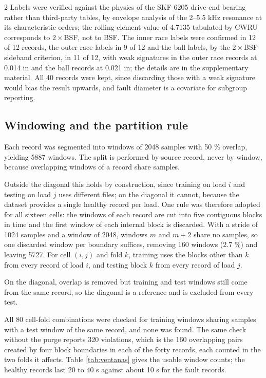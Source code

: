 \documentclass[12pt,twoside,titlepage]{ingenius}
\begin{document}
\begin{multicols}{2}
Labels were verified against the physics of the SKF 6205 drive-end bearing
rather than third-party tables, by envelope analysis of the 2--5.5 kHz
resonance at its characteristic orders; the rolling-element value of 4.7135
tabulated by CWRU corresponds to $2\times$BSF, not to BSF. The inner race labels
were confirmed in 12 of 12 records, the outer race labels in 9 of 12 and the
ball labels, by the $2\times$BSF sideband criterion, in 11 of 12, with weak
signatures in the outer race records at 0.014 in and the ball records at
0.021 in; the details are in the supplementary material. All 40 records were
kept, since discarding those with a weak signature would bias the result
upwards, and fault diameter is a covariate for subgroup reporting.

\subsection{Windowing and the partition rule}

Each record was segmented into windows of 2048 samples with 50 \% overlap,
yielding 5887 windows. The split is performed by source record, never by window,
because overlapping windows of a record share samples.

Outside the diagonal this holds by construction, since training on load $i$ and
testing on load $j$ uses different files; on the diagonal it cannot, because the
dataset provides a single healthy record per load. One rule was therefore
adopted for all sixteen cells: the windows of each record are cut into five
contiguous blocks in time and the first window of each internal block is
discarded. With a stride of 1024 samples and a window of 2048, windows $m$ and
$m+2$ share no samples, so one discarded window per boundary suffices, removing
160 windows (2.7 \%) and leaving 5727. For cell $(i,j)$ and fold $k$, training
uses the blocks other than $k$ from every record of load $i$, and testing block
$k$ from every record of load $j$.

On the diagonal, overlap is removed but
training and test windows still come from the same record, so the diagonal is a
reference and is excluded from every test.

All 80 cell-fold combinations were checked for training windows sharing samples
with a test window of the same record, and none was found. The same check
without the purge reports 320 violations, which is the 160 overlapping pairs
created by four block boundaries in each of the forty records, each counted in
the two folds it affects. Table \ref{tab:ventanas} gives the usable window
counts; the healthy records last 20 to 40 s against about 10 s for the fault
records.


\end{multicols}
\end{document}
